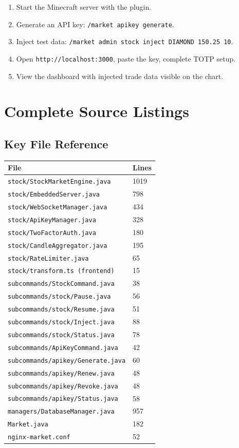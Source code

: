 \documentclass[12pt,a4paper]{report}
\begin{document}
\begin{enumerate}
\item Start the Minecraft server with the plugin.
\item Generate an API key: \texttt{/market apikey generate}.
\item Inject test data: \texttt{/market admin stock inject DIAMOND 150.25 10}.
\item Open \texttt{http://localhost:3000}, paste the key, complete TOTP setup.
\item View the dashboard with injected trade data visible on the chart.
\end{enumerate}

\chapter{Complete Source Listings}

\section{Key File Reference}

\begin{longtable}{ll}
\toprule
\textbf{File} & \textbf{Lines} \\
\midrule
\endhead
\texttt{stock/StockMarketEngine.java} & 1019 \\
\texttt{stock/EmbeddedServer.java} & 798 \\
\texttt{stock/WebSocketManager.java} & 434 \\
\texttt{stock/ApiKeyManager.java} & 328 \\
\texttt{stock/TwoFactorAuth.java} & 180 \\
\texttt{stock/CandleAggregator.java} & 195 \\
\texttt{stock/RateLimiter.java} & 65 \\
\texttt{stock/transform.ts (frontend)} & 15 \\
\texttt{subcommands/StockCommand.java} & 38 \\
\texttt{subcommands/stock/Pause.java} & 56 \\
\texttt{subcommands/stock/Resume.java} & 51 \\
\texttt{subcommands/stock/Inject.java} & 88 \\
\texttt{subcommands/stock/Status.java} & 78 \\
\texttt{subcommands/ApiKeyCommand.java} & 42 \\
\texttt{subcommands/apikey/Generate.java} & 60 \\
\texttt{subcommands/apikey/Renew.java} & 48 \\
\texttt{subcommands/apikey/Revoke.java} & 48 \\
\texttt{subcommands/apikey/Status.java} & 58 \\
\texttt{managers/DatabaseManager.java} & 957 \\
\texttt{Market.java} & 182 \\
\texttt{nginx-market.conf} & 52 \\
\bottomrule
\end{longtable}
\end{document}
